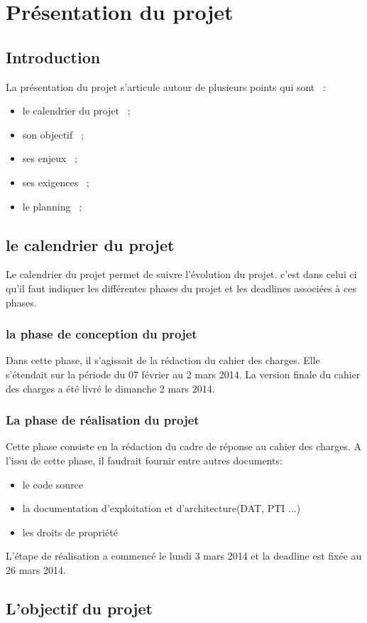 \chapter{Présentation du projet}

% 

\section{Introduction}
La présentation du projet s'articule autour de plusieurs points qui sont ~: 
\begin{itemize}
   \item le calendrier du projet ~;
   \item son objectif ~;
   \item ses enjeux ~;
   \item ses exigences ~;
   \item le planning ~;
\end{itemize}

\section{le calendrier du projet}
Le calendrier du projet permet de suivre l'évolution du projet. c'est dans celui ci qu'il faut indiquer les différentes phases du projet et les deadlines associées à ces phases.

\subsection{la phase de conception du projet}
Dans cette phase, il s'agissait de la rédaction du cahier des charges. Elle s'étendait sur la période du 07 février au 2 mars 2014. La version finale du cahier des charges a été livré le dimanche 2 mars 2014. 

\subsection{La phase de réalisation du projet}
Cette phase consiste en la rédaction du cadre de réponse au cahier des charges. A l'issu de cette phase, il faudrait fournir entre autres documents:
  \begin{itemize}
    \item le code source
    \item la documentation d'exploitation et d'architecture(DAT, PTI ...)
    \item les droits de propriété
  \end{itemize}

L'étape de réalisation a commencé le lundi 3 mars 2014 et la deadline est fixée au 26 mars 2014.

\section{L'objectif du projet}
 